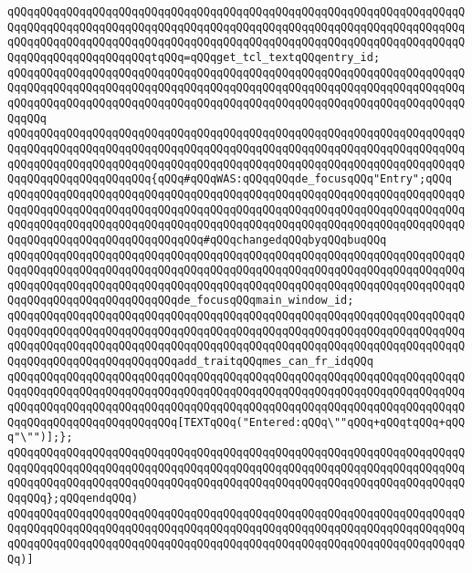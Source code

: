 \verb|qQQqqQQqqQQqqQQqqQQqqQQqqQQqqQQqqQQqqQQqqQQqqQQqqQQqqQQqqQQqqQQqqQQqqQQqqQQqqQQqqQQqqQQqqQQqqQQqqQQqqQQqqQQqqQQqqQQqqQQqqQQqqQQqqQQqqQQqqQQqqQQqqQQqqQQqqQQqqQQqqQQqqQQqqQQqqQQqqQQqqQQqqQQqqQQqqQQqqQQqqQQqqQQqqQQqqQQqqQQqqQQqqQQqqQQqtqQQq=qQQqget_tcl_textqQQqentry_id;|\newline
\verb|qQQqqQQqqQQqqQQqqQQqqQQqqQQqqQQqqQQqqQQqqQQqqQQqqQQqqQQqqQQqqQQqqQQqqQQqqQQqqQQqqQQqqQQqqQQqqQQqqQQqqQQqqQQqqQQqqQQqqQQqqQQqqQQqqQQqqQQqqQQqqQQqqQQqqQQqqQQqqQQqqQQqqQQqqQQqqQQqqQQqqQQqqQQqqQQqqQQqqQQqqQQqqQQqqQQqqQQq|\newline
\verb|qQQqqQQqqQQqqQQqqQQqqQQqqQQqqQQqqQQqqQQqqQQqqQQqqQQqqQQqqQQqqQQqqQQqqQQqqQQqqQQqqQQqqQQqqQQqqQQqqQQqqQQqqQQqqQQqqQQqqQQqqQQqqQQqqQQqqQQqqQQqqQQqqQQqqQQqqQQqqQQqqQQqqQQqqQQqqQQqqQQqqQQqqQQqqQQqqQQqqQQqqQQqqQQqqQQqqQQqqQQqqQQqqQQqqQQq{qQQq#qQQqWAS:qQQqqQQqde_focusqQQq"Entry";qQQq|\newline
\verb|qQQqqQQqqQQqqQQqqQQqqQQqqQQqqQQqqQQqqQQqqQQqqQQqqQQqqQQqqQQqqQQqqQQqqQQqqQQqqQQqqQQqqQQqqQQqqQQqqQQqqQQqqQQqqQQqqQQqqQQqqQQqqQQqqQQqqQQqqQQqqQQqqQQqqQQqqQQqqQQqqQQqqQQqqQQqqQQqqQQqqQQqqQQqqQQqqQQqqQQqqQQqqQQqqQQqqQQqqQQqqQQqqQQqqQQqqQQqqQQq#qQQqchangedqQQqbyqQQqbuqQQq|\newline
\verb|qQQqqQQqqQQqqQQqqQQqqQQqqQQqqQQqqQQqqQQqqQQqqQQqqQQqqQQqqQQqqQQqqQQqqQQqqQQqqQQqqQQqqQQqqQQqqQQqqQQqqQQqqQQqqQQqqQQqqQQqqQQqqQQqqQQqqQQqqQQqqQQqqQQqqQQqqQQqqQQqqQQqqQQqqQQqqQQqqQQqqQQqqQQqqQQqqQQqqQQqqQQqqQQqqQQqqQQqqQQqqQQqqQQqqQQqqQQqde_focusqQQqmain_window_id;|\newline
\verb|qQQqqQQqqQQqqQQqqQQqqQQqqQQqqQQqqQQqqQQqqQQqqQQqqQQqqQQqqQQqqQQqqQQqqQQqqQQqqQQqqQQqqQQqqQQqqQQqqQQqqQQqqQQqqQQqqQQqqQQqqQQqqQQqqQQqqQQqqQQqqQQqqQQqqQQqqQQqqQQqqQQqqQQqqQQqqQQqqQQqqQQqqQQqqQQqqQQqqQQqqQQqqQQqqQQqqQQqqQQqqQQqqQQqqQQqqQQqadd_traitqQQqmes_can_fr_idqQQq|\newline
\verb|qQQqqQQqqQQqqQQqqQQqqQQqqQQqqQQqqQQqqQQqqQQqqQQqqQQqqQQqqQQqqQQqqQQqqQQqqQQqqQQqqQQqqQQqqQQqqQQqqQQqqQQqqQQqqQQqqQQqqQQqqQQqqQQqqQQqqQQqqQQqqQQqqQQqqQQqqQQqqQQqqQQqqQQqqQQqqQQqqQQqqQQqqQQqqQQqqQQqqQQqqQQqqQQqqQQqqQQqqQQqqQQqqQQqqQQqqQQq[TEXTqQQq("Entered:qQQq\""qQQq+qQQqtqQQq+qQQq"\"")];};|\newline
\verb|qQQqqQQqqQQqqQQqqQQqqQQqqQQqqQQqqQQqqQQqqQQqqQQqqQQqqQQqqQQqqQQqqQQqqQQqqQQqqQQqqQQqqQQqqQQqqQQqqQQqqQQqqQQqqQQqqQQqqQQqqQQqqQQqqQQqqQQqqQQqqQQqqQQqqQQqqQQqqQQqqQQqqQQqqQQqqQQqqQQqqQQqqQQqqQQqqQQqqQQqqQQqqQQqqQQqqQQq};qQQqendqQQq)|\newline
\verb|qQQqqQQqqQQqqQQqqQQqqQQqqQQqqQQqqQQqqQQqqQQqqQQqqQQqqQQqqQQqqQQqqQQqqQQqqQQqqQQqqQQqqQQqqQQqqQQqqQQqqQQqqQQqqQQqqQQqqQQqqQQqqQQqqQQqqQQqqQQqqQQqqQQqqQQqqQQqqQQqqQQqqQQqqQQqqQQqqQQqqQQqqQQqqQQqqQQqqQQqqQQqqQQqqQQq)]|\newline
